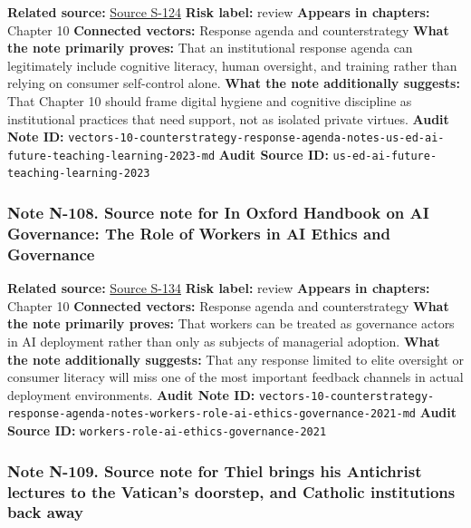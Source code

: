 \documentclass[
  american,
  11pt,
  letterpaper,
]{article}
\begin{document}
\textbf{Related source:}
\hyperref[source-s-124-artificial-intelligence-and-the-future-of-teaching-and-learning-insights-and-recommendations]{Source
S-124} \textbf{Risk label:} review \textbf{Appears in chapters:} Chapter
10 \textbf{Connected vectors:} Response agenda and counterstrategy
\textbf{What the note primarily proves:} That an institutional response
agenda can legitimately include cognitive literacy, human oversight, and
training rather than relying on consumer self-control alone.
\textbf{What the note additionally suggests:} That Chapter 10 should
frame digital hygiene and cognitive discipline as institutional
practices that need support, not as isolated private virtues.
\textbf{Audit Note ID:}
\texttt{vectors-10-counterstrategy-response-agenda-notes-us-ed-ai-future-teaching-learning-2023-md}
\textbf{Audit Source ID:}
\texttt{us-ed-ai-future-teaching-learning-2023}

\subsubsection{Note N-108. Source note for In Oxford Handbook on AI
Governance: The Role of Workers in AI Ethics and
Governance}\label{note-n-108-vectors-10-counterstrategy-response-agenda-notes-workers-role-ai-ethics-governance-2021-md}

\textbf{Related source:}
\hyperref[source-s-134-in-oxford-handbook-on-ai-governance-the-role-of-workers-in-ai-ethics-and-governance]{Source
S-134} \textbf{Risk label:} review \textbf{Appears in chapters:} Chapter
10 \textbf{Connected vectors:} Response agenda and counterstrategy
\textbf{What the note primarily proves:} That workers can be treated as
governance actors in AI deployment rather than only as subjects of
managerial adoption. \textbf{What the note additionally suggests:} That
any response limited to elite oversight or consumer literacy will miss
one of the most important feedback channels in actual deployment
environments. \textbf{Audit Note ID:}
\texttt{vectors-10-counterstrategy-response-agenda-notes-workers-role-ai-ethics-governance-2021-md}
\textbf{Audit Source ID:}
\texttt{workers-role-ai-ethics-governance-2021}

\subsubsection{Note N-109. Source note for Thiel brings his Antichrist
lectures to the Vatican's doorstep, and Catholic institutions back
away}\label{note-n-109-vectors-11-facebook-thiel-intelligence-adjacency-notes-ap-thiel-antichrist-vance-2026-md}
\end{document}

